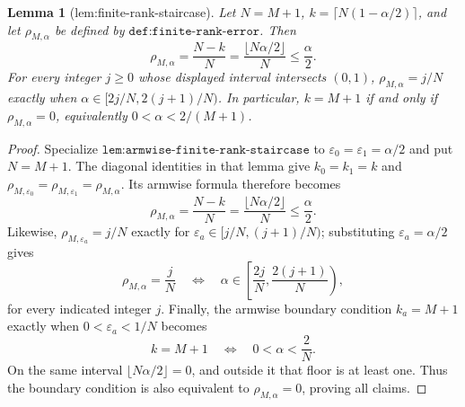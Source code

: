 \documentclass{article}
\newtheorem{lemma}{Lemma}
\begin{document}
\begin{lemma}[lem:finite-rank-staircase]\label{lem:finite-rank-staircase}
Let \(N=M+1\), \(k=\lceil N(1-\alpha/2)\rceil\), and let \(\rho_{M,\alpha}\) be defined by \(\texttt{def:finite-rank-error}\). Then \[\rho_{M,\alpha}=\frac{N-k}{N}=\frac{\lfloor N\alpha/2\rfloor}{N}\le\frac{\alpha}{2}.\] For every integer \(j\ge0\) whose displayed interval intersects \((0,1)\), \(\rho_{M,\alpha}=j/N\) exactly when \(\alpha\in[2j/N,2(j+1)/N)\). In particular, \(k=M+1\) if and only if \(\rho_{M,\alpha}=0\), equivalently \(0<\alpha<2/(M+1)\).
\end{lemma}
\begin{proof}
Specialize \(\texttt{lem:armwise-finite-rank-staircase}\) to \(\varepsilon_0=\varepsilon_1=\alpha/2\) and put \(N=M+1\). The diagonal identities in that lemma give \(k_0=k_1=k\) and \(\rho_{M,\varepsilon_0}=\rho_{M,\varepsilon_1}=\rho_{M,\alpha}\). Its armwise formula therefore becomes
\[\rho_{M,\alpha}=\frac{N-k}{N}=\frac{\lfloor N\alpha/2\rfloor}{N}\le\frac{\alpha}{2}.\]
Likewise, \(\rho_{M,\varepsilon_a}=j/N\) exactly for \(\varepsilon_a\in[j/N,(j+1)/N)\); substituting \(\varepsilon_a=\alpha/2\) gives
\[\rho_{M,\alpha}=\frac jN\quad\Longleftrightarrow\quad\alpha\in\left[\frac{2j}{N},\frac{2(j+1)}{N}\right),\]
for every indicated integer \(j\). Finally, the armwise boundary condition \(k_a=M+1\) exactly when \(0<\varepsilon_a<1/N\) becomes
\[k=M+1\quad\Longleftrightarrow\quad0<\alpha<\frac2N.\]
On the same interval \(\lfloor N\alpha/2\rfloor=0\), and outside it that floor is at least one. Thus the boundary condition is also equivalent to \(\rho_{M,\alpha}=0\), proving all claims.
\end{proof}
\end{document}
